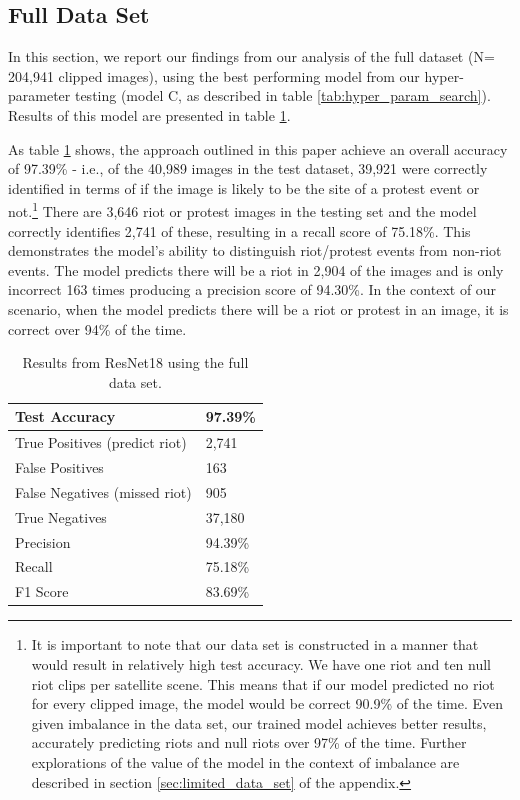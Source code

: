 \subsection{Full Data Set}
In this section, we report our findings from our analysis of the full dataset (N= 204,941 clipped images), using the best performing model from our hyper-parameter testing (model C, as described in table \ref{tab:hyper_param_search}).  Results of this model are presented in table \ref{tab:fulldata_results_table}.  
\par
As table \ref{tab:fulldata_results_table} shows, the approach outlined in this paper achieve an overall accuracy of 97.39\% - i.e., of the 40,989 images in the test dataset, 39,921 were correctly identified in terms of if the image is likely to be the site of a protest event or not.\footnote{It is important to note that our data set is constructed in a manner that would result in relatively high test accuracy.  We have one riot and ten null riot clips per satellite scene.  This means that if our model predicted no riot for every clipped image, the model would be correct 90.9\% of the time.  Even given imbalance in the data set, our trained model achieves better results, accurately predicting riots and null riots over 97\% of the time.  Further explorations of the value of the model in the context of imbalance are described in section \ref{sec:limited_data_set} of the appendix.} There are 3,646 riot or protest images in the testing set and the model correctly identifies 2,741 of these, resulting in a recall score of 75.18\%.  This demonstrates the model's ability to distinguish riot/protest events from non-riot events.  The model predicts there will be a riot in 2,904 of the images and is only incorrect 163 times producing a precision score of 94.30\%.  In the context of our scenario, when the model predicts there will be a riot or protest in an image, it is correct over 94\% of the time. 




\begin{table}
    \centering
    \begin{tabular}{|l|l|}

        \hline
        \textbf{Test Accuracy}  & \textbf{97.39\%} \\
        \hline
        True Positives (predict riot) & 2,741 \\
        \hline
        False Positives & 163 \\
        \hline
        False Negatives (missed riot) & 905 \\
        \hline
        True Negatives & 37,180 \\
        \hline
        \hline
        Precision & 94.39\% \\
        \hline
        Recall & 75.18\% \\
        \hline
        F1 Score & 83.69\%  \\
        \hline
    \end{tabular}
    \caption{Results from ResNet18 using the full data set.}
    \label{tab:fulldata_results_table}
\end{table}



